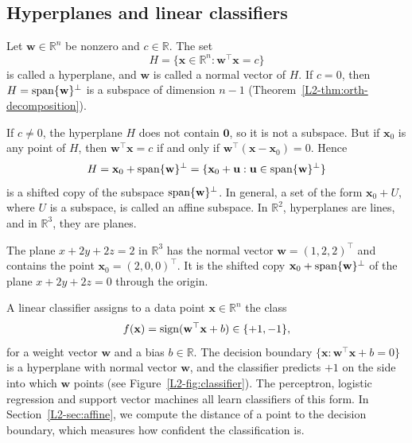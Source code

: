 \subsection{Hyperplanes and linear classifiers}

\begin{definition}[Hyperplane]
    Let $\mathbf{w} \in \mathbb{R}^n$ be nonzero and $c \in \mathbb{R}$. The set
    \[H = \{\mathbf{x} \in \mathbb{R}^n : \mathbf{w}^\top \mathbf{x} = c\}\]
    is called a hyperplane, and $\mathbf{w}$ is called a normal vector of $H$. If $c = 0$, then $H = \operatorname{span}\{\mathbf{w}\}^\perp$ is a subspace of dimension $n - 1$ (Theorem~\ref{L2-thm:orth-decomposition}).
\end{definition}

If $c \neq 0$, the hyperplane $H$ does not contain $\mathbf{0}$, so it is not a subspace. But if $\mathbf{x}_0$ is any point of $H$, then $\mathbf{w}^\top \mathbf{x} = c$ if and only if $\mathbf{w}^\top (\mathbf{x} - \mathbf{x}_0) = 0$. Hence
\[H = \mathbf{x}_0 + \operatorname{span}\{\mathbf{w}\}^\perp = \{\mathbf{x}_0 + \mathbf{u} : \mathbf{u} \in \operatorname{span}\{\mathbf{w}\}^\perp\}\]
is a shifted copy of the subspace $\operatorname{span}\{\mathbf{w}\}^\perp$. In general, a set of the form $\mathbf{x}_0 + U$, where $U$ is a subspace, is called an affine subspace. In $\mathbb{R}^2$, hyperplanes are lines, and in $\mathbb{R}^3$, they are planes.

\begin{example}
    The plane $x + 2y + 2z = 2$ in $\mathbb{R}^3$ has the normal vector $\mathbf{w} = (1, 2, 2)^\top$ and contains the point $\mathbf{x}_0 = (2, 0, 0)^\top$. It is the shifted copy $\mathbf{x}_0 + \operatorname{span}\{\mathbf{w}\}^\perp$ of the plane $x + 2y + 2z = 0$ through the origin.
\end{example}

\begin{remark}\label{L2-rem:linear-classifier}
    A linear classifier assigns to a data point $\mathbf{x} \in \mathbb{R}^n$ the class
    \[f(\mathbf{x}) = \operatorname{sign}(\mathbf{w}^\top \mathbf{x} + b) \in \{+1, -1\},\]
    for a weight vector $\mathbf{w}$ and a bias $b \in \mathbb{R}$. The decision boundary $\{\mathbf{x} : \mathbf{w}^\top \mathbf{x} + b = 0\}$ is a hyperplane with normal vector $\mathbf{w}$, and the classifier predicts $+1$ on the side into which $\mathbf{w}$ points (see Figure~\ref{L2-fig:classifier}). The perceptron, logistic regression and support vector machines all learn classifiers of this form. In Section~\ref{L2-sec:affine}, we compute the distance of a point to the decision boundary, which measures how confident the classification is.
\end{remark}

